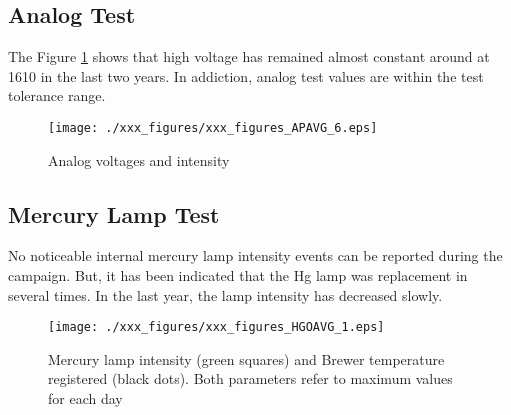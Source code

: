 \subsection{Analog Test} \label{subsec:AP}
The Figure \ref{fig:APAVG} shows that high voltage has remained almost constant around at 1610 in the last two years. In addiction, analog test values are within the test tolerance range. 


\begin{figure}[hbtp!]
\begin{center}
\texttt{[image: ./xxx\_figures/xxx\_figures\_APAVG\_6.eps]}
           \caption{Analog voltages and intensity}
	         \label{fig:APAVG}
\end{center}
\end{figure}

\subsection{Mercury Lamp Test} \label{subsec:HG}
No noticeable internal mercury lamp intensity events can be reported during the campaign. But, it has been indicated that the Hg lamp was replacement in several times. In the last year, the lamp intensity has decreased slowly. %


\begin{figure}[hbtp!]
\begin{center}
\texttt{[image: ./xxx\_figures/xxx\_figures\_HGOAVG\_1.eps]}
           \caption{Mercury lamp intensity (green squares) and Brewer temperature registered (black dots). Both parameters refer to maximum values for each day}
           \label{fig:HGAVG}
\end{center}
\end{figure}

